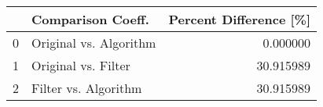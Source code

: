 \begin{tabular}{llr}
\toprule
{} &       Comparison Coeff. &  Percent Difference [\%] \\
\midrule
0 &  Original vs. Algorithm &                0.000000 \\
1 &     Original vs. Filter &               30.915989 \\
2 &    Filter vs. Algorithm &               30.915989 \\
\bottomrule
\end{tabular}
